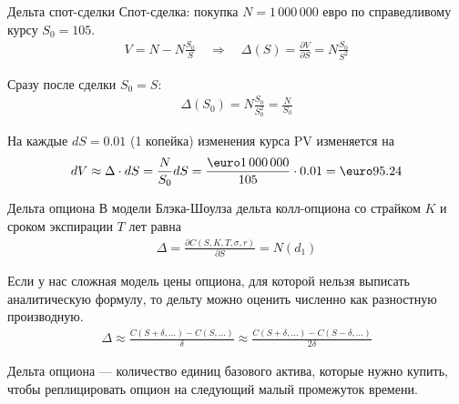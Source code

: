 \documentclass{beamer}
\renewcommand{\EUR}[1]{\textup{\euro}#1}
\begin{document}
\begin{frame}{Дельта спот-сделки}
\justify
Спот-сделка: покупка $N=1\,000\,000$ евро по справедливому курсу $S_0=105$.
\begin{align*}
V = N - N\frac{S_0}{S} \quad \Rightarrow \quad \Delta(S) = \frac{\partial V}{\partial S} = N\frac{S_0}{S^2}
\end{align*}

\justify
Сразу после сделки $S_0=S$:
\begin{align*}
\Delta(S_0) = N\frac{S_0}{S_0^2} = \frac{N}{S_0}
\end{align*}

\justify
На каждые $dS=0.01$ (1 копейка) изменения курса PV изменяется на
\begin{align*}
dV \approx \Delta \cdot dS = \frac{N}{S_0}dS = \frac{\EUR{1\,000\,000}}{105}\cdot 0.01 = \EUR{95.24}
\end{align*}
\end{frame}



\begin{frame}{Дельта опциона}
\justify
В модели Блэка-Шоулза дельта колл-опциона со страйком $K$ и сроком экспирации $T$ лет равна
\begin{align*}
\Delta = \frac{\partial C(S, K, T, \sigma, r)}{\partial S} = N(d_1)
\end{align*}

\justify
Если у нас сложная модель цены опциона, для которой нельзя выписать аналитическую формулу, то дельту можно оценить численно как разностную производную.
\begin{align*}
\Delta \approx \frac{C(S+\delta,...) - C(S,...)}{\delta} \approx \frac{C(S+\delta,...) - C(S-\delta,...)}{2\delta}
\end{align*}

\justify
Дельта опциона --- количество единиц базового актива, которые нужно купить, чтобы реплицировать опцион на следующий малый промежуток времени.
\end{frame}
\end{document}
